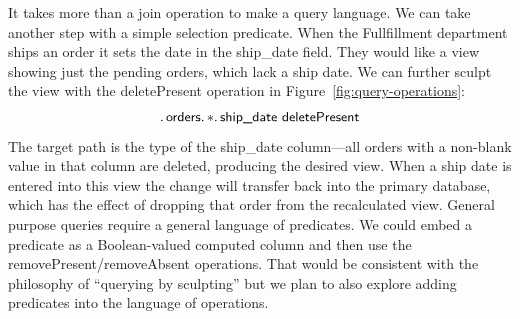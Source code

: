 \documentclass[english,submission]{programming}
\theoremstyle{definition}
\begin{document}
It takes more than a join operation to make a query language. We can take another step with a simple selection predicate. When the Fullfillment department ships an order it sets the date in the \textsf{ship\_date} field. They would like a view showing just the pending orders, which lack a ship date. We can further sculpt the view with the \textsf{deletePresent} operation in Figure~\ref{fig:query-operations}:
\[
\ldotp \textsf{orders}\ldotp * \ldotp \textsf{ship\_date deletePresent} \\
\]
The target path is the type of the \textsf{ship\_date} column---all orders with a non-blank value in that column are deleted, producing the desired view. When a ship date is entered into this view the change will transfer back into the primary database, which has the effect of dropping that order from the recalculated view.
General purpose queries require a general language of predicates. We could embed a predicate as a Boolean-valued computed column and then use the \textsf{removePresent/removeAbsent} operations. That would be consistent with the philosophy of ``querying by sculpting'' but we plan to also explore adding predicates into the language of operations.
\end{document}
